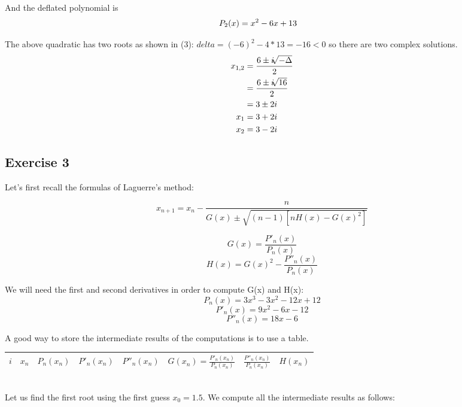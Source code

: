 \documentclass[12pt]{article}
\begin{document}
And the deflated polynomial is
\begin{align}
P_2(x) &= x^2 - 6x + 13 \notag
\end{align}



The above quadratic has two roots as shown in (3):
$delta = (-6)^2-4*13 = -16 < 0$ so there are two complex solutions.
\begin{align}
x_{1,2} &= \frac{6 \pm i \sqrt[]{-\Delta}}{2} \notag \\
&= \frac{6 \pm i \sqrt[]{16}}{2} \notag \\
&= 3 \pm 2i \notag \\
x_1 &= 3 + 2i \notag \\
x_2 &= 3 - 2i \notag
\end{align}

\subsection{Exercise 3}
Let's first recall the formulas of Laguerre's method:

$$ x_{n+1} = x_n - \frac{ n }{ G(x) \pm \sqrt{ (n-1) [nH(x) - G(x)^2] } } $$

$$ G(x) = \frac{ P'_n(x) }{ P_n(x) } $$
$$ H(x) = G(x)^2 - \frac{ P''_n(x) }{ P_n(x) } $$

We will need the first and second derivatives in order to compute G(x) and H(x):\\

$$ P_n(x) = 3x^3-3x^2-12x+12 $$
$$ P'_n(x) = 9x^2-6x-12 $$
$$ P''_n(x) = 18x-6 $$

A good way to store the intermediate results of the computations is to use a table. \\

\begin{tabular}{|c|c|c|c|c|c|c|c|}
  \hline
  $i$ & $x_n$ & $P_n(x_n)$ & $P'_n(x_n)$ & $P''_n(x_n)$ & $G(x_n)=\frac{ P'_n(x_n) }{ P_n(x_n) }$ & $\frac{ P''_n(x_n) }{ P_n(x_n) }$ & $H(x_n)$ \\ \hline
\end{tabular} \\

Let us find the first root using the first guess $x_0 = 1.5$. We compute all the intermediate results as follows: \\
\end{document}
